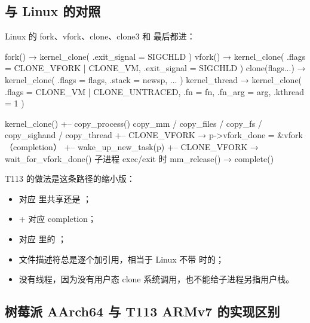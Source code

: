 \subsection{与 Linux 的对照}

Linux 的 fork、vfork、clone、clone3 和  最后都进：

\begin{txtcode}[basicstyle=\ttfamily\scriptsize]
fork()        → kernel_clone({ .exit_signal = SIGCHLD })
vfork()       → kernel_clone({ .flags = CLONE_VFORK | CLONE_VM, .exit_signal = SIGCHLD })
clone(flags...) → kernel_clone({ .flags = flags, .stack = newsp, ... })
kernel_thread → kernel_clone({ .flags = CLONE_VM | CLONE_UNTRACED, .fn = fn, .fn_arg = arg, .kthread = 1 })

kernel_clone()
+-- copy_process()          copy_mm / copy_files / copy_fs / copy_sighand / copy_thread
+-- CLONE_VFORK → p->vfork_done = &vfork（completion）
+-- wake_up_new_task(p)
+-- CLONE_VFORK → wait_for_vfork_done()   子进程 exec/exit 时 mm_release() → complete()
\end{txtcode}

T113 的做法是这条路径的缩小版：

\begin{itemize}
  \item {} 对应  里共享还是 ；
  \item {} +  对应  completion；
  \item {} 对应  里的 ；
  \item 文件描述符总是逐个加引用，相当于 Linux 不带  时的；
  \item 没有线程，因为没有用户态 clone 系统调用，也不能给子进程另指用户栈。
\end{itemize}

\subsection{树莓派 AArch64 与 T113 ARMv7 的实现区别}

